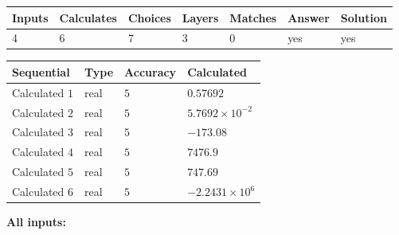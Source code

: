 \documentclass[12pt]{article}
\begin{document}
 

 
\vspace{0.3in}
   
   
   
   
\noindent\begin{tabular}{|l|l|l|l|l|l|l|}
 \hline
Inputs & Calculates & Choices & Layers & Matches & Answer & Solution \\ \hline
           4  & 
           6  & 
           7
  & 
           3  & 
           0  & 
  yes & 
  yes 
  \\ \hline
 \end{tabular}
   
   
   
   
\noindent{}
   
   
  
  
\noindent\begin{tabular}{|l|l|l|l|}
\hline
 Sequential & Type & Accuracy & Calculated \\ 
\hline
 
 
  Calculated $            1 $ & real & $            5  $ & 
 $ 0.57692 $ 
 \\  \hline  
 
 
  Calculated $            2 $ & real & $            5  $ & 
 $ 5.7692 \times 10^{-2} $ 
 \\  \hline  
 
 
  Calculated $            3 $ & real & $            5  $ & 
 $ -173.08 $ 
 \\  \hline  
 
 
  Calculated $            4 $ & real & $            5  $ & 
 $ 7476.9 $ 
 \\  \hline  
 
 
  Calculated $            5 $ & real & $            5  $ & 
 $ 747.69 $ 
 \\  \hline  
 
 
  Calculated $            6 $ & real & $            5  $ & 
 $ -2.2431 \times 10^{6} $ 
 \\  \hline  
 \end{tabular}
   
   
   
   
\noindent\vspace{0.1in}\hspace{-0.08in} {\textbf{\Large{All inputs: }}}
   
   
  
\end{document}
